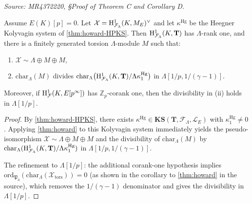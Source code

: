 \begin{theorem}
  \label{thm:howard-HP}
  \textit{Source: MR4372220, §Proof of Theorem C and Corollary D.}

  Assume \(E(K)[p] = 0\). Let \(\mathcal{X} = \mathrm{H}^1_{\mathcal{F}_\Lambda}(K, M_E)^\vee\) and let \(\kappa^{\mathrm{Hg}}\) be the Heegner Kolyvagin system of \cref{thm:howard-HPKS}. Then \(\mathrm{H}^1_{\mathcal{F}_\Lambda}(K, \mathbf{T})\) has \(\Lambda\)-rank one, and there is a finitely generated torsion \(\Lambda\)-module \(M\) such that:
  \begin{enumerate}
    \item[(i)] \(\mathcal{X} \sim \Lambda \oplus M \oplus M\),
    \item[(ii)] \(\mathrm{char}_\Lambda(M)\) divides \(\mathrm{char}_\Lambda\bigl(\mathrm{H}^1_{\mathcal{F}_\Lambda}(K, \mathbf{T})/\Lambda\kappa_1^{\mathrm{Hg}}\bigr)\) in \(\Lambda[1/p, 1/(\gamma-1)]\).
  \end{enumerate}
  Moreover, if \(\mathrm{H}^1_{\mathcal{F}}(K, E[p^\infty])\) has \(\mathbb{Z}_p\)-corank one, then the divisibility in \textup{(ii)} holds in \(\Lambda[1/p]\).
\end{theorem}

\begin{proof}
  By \cref{thm:howard-HPKS}, there exists \(\kappa^{\mathrm{Hg}} \in \mathbf{KS}(\mathbf{T}, \mathcal{F}_\Lambda, \mathcal{L}_E)\) with \(\kappa_1^{\mathrm{Hg}} \neq 0\). Applying \cref{thm:howard} to this Kolyvagin system immediately yields the pseudo-isomorphism \(\mathcal{X} \sim \Lambda \oplus M \oplus M\) and the divisibility of \(\mathrm{char}_\Lambda(M)\) by \(\mathrm{char}_\Lambda(\mathrm{H}^1_{\mathcal{F}_\Lambda}(K, \mathbf{T})/\Lambda\kappa_1^{\mathrm{Hg}})\) in \(\Lambda[1/p, 1/(\gamma-1)]\).

  The refinement to \(\Lambda[1/p]\): the additional corank-one hypothesis implies \(\mathrm{ord}_{\mathfrak{P}_0}(\mathrm{char}_\Lambda(\mathcal{X}_{\mathrm{tors}})) = 0\) (as shown in the corollary to \cref{thm:howard} in the source), which removes the \(1/(\gamma-1)\) denominator and gives the divisibility in \(\Lambda[1/p]\).
\end{proof}
